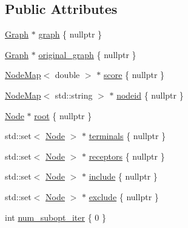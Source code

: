 \subsection*{Public Attributes}
\begin{DoxyCompactItemize}
\item 
\hyperlink{namespacederegnet_a55b76c55bbabc682cbc61f8b9948799e}{Graph} $\ast$ \hyperlink{classderegnet_1_1DeregnetData_ab76d30fa2ef87099faecb31e3f95b6d6}{graph} \{ nullptr \}
\item 
\hyperlink{namespacederegnet_a55b76c55bbabc682cbc61f8b9948799e}{Graph} $\ast$ \hyperlink{classderegnet_1_1DeregnetData_a3ea2abe9900785d80fa0141afdd985a9}{original\+\_\+graph} \{ nullptr \}
\item 
\hyperlink{namespacederegnet_ae102b707ae1d6f83c639ece5e0dd5658}{Node\+Map}$<$ double $>$ $\ast$ \hyperlink{classderegnet_1_1DeregnetData_a32970c8f43eb8be313ad08d829223b1f}{score} \{ nullptr \}
\item 
\hyperlink{namespacederegnet_ae102b707ae1d6f83c639ece5e0dd5658}{Node\+Map}$<$ std\+::string $>$ $\ast$ \hyperlink{classderegnet_1_1DeregnetData_a3b57d7ed19c104c7fe257e17f0d2cfb5}{nodeid} \{ nullptr \}
\item 
\hyperlink{namespacederegnet_a744bad34f2de9856d36715a445f027f3}{Node} $\ast$ \hyperlink{classderegnet_1_1DeregnetData_a51a22fd88f929b1b1a00edb409b4cd55}{root} \{ nullptr \}
\item 
std\+::set$<$ \hyperlink{namespacederegnet_a744bad34f2de9856d36715a445f027f3}{Node} $>$ $\ast$ \hyperlink{classderegnet_1_1DeregnetData_a1fe559c6056cd411647f836849e4b0da}{terminals} \{ nullptr \}
\item 
std\+::set$<$ \hyperlink{namespacederegnet_a744bad34f2de9856d36715a445f027f3}{Node} $>$ $\ast$ \hyperlink{classderegnet_1_1DeregnetData_a470cc9f84741c59897ab1e7a3daa1205}{receptors} \{ nullptr \}
\item 
std\+::set$<$ \hyperlink{namespacederegnet_a744bad34f2de9856d36715a445f027f3}{Node} $>$ $\ast$ \hyperlink{classderegnet_1_1DeregnetData_a438d16e60be5d119d174aa039f070ab2}{include} \{ nullptr \}
\item 
std\+::set$<$ \hyperlink{namespacederegnet_a744bad34f2de9856d36715a445f027f3}{Node} $>$ $\ast$ \hyperlink{classderegnet_1_1DeregnetData_a8e4398e6ece11ef87767914c6f2c304d}{exclude} \{ nullptr \}
\item 
int \hyperlink{classderegnet_1_1DeregnetData_adb7428cd99112156ae9f80187af9ebbe}{num\+\_\+subopt\+\_\+iter} \{ 0 \}
\item 

\end{DoxyCompactItemize}
